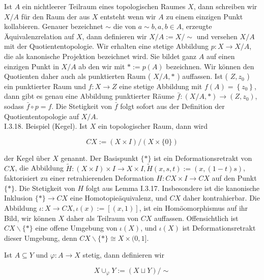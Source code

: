 \documentclass[10pt]{article}
\begin{document}
Ist $A$ ein nichtleerer Teilraum eines topologischen Raumes $X$, dann schreiben wir $X / A$ für den Raum der aus $X$ entsteht wenn wir $A$ zu einem einzigen Punkt kollabieren. Genauer bezeichnet $\sim$ die von $a \sim b, a, b \in A$, erzeugte Äquivalenzrelation auf $X$, dann definieren wir $X / A:=X / \sim$ und versehen $X / A$ mit der Quotiententopologie. Wir erhalten eine stetige Abbildung $p: X \rightarrow X / A$, die als kanonische Projektion bezeichnet wird. Sie bildet ganz $A$ auf einen einzigen Punkt in $X / A$ ab den wir mit $*:=p(A)$ bezeichnen. Wir können den Quotienten daher auch als punktierten Raum ( $X / A, *$ ) auffassen. Ist ( $Z, z_{0}$ ) ein punktierter Raum und $f: X \rightarrow Z$ eine stetige Abbildung mit $f(A)=\left\{z_{0}\right\}$, dann gibt es genau eine Abbildung punktierter Räume $\bar{f}:(X / A, *) \rightarrow\left(Z, z_{0}\right)$, sodass $\bar{f} \circ p=f$. Die Stetigkeit von $\bar{f}$ folgt sofort aus der Definition der Quotiententopologie auf $X / A$.\\
I.3.18. Beispiel (Kegel). Ist $X$ ein topologischer Raum, dann wird

$$
C X:=(X \times I) /(X \times\{0\})
$$

der Kegel über $X$ genannt. Der Basispunkt $\{*\}$ ist ein Deformationsretrakt von $C X$, die Abbildung $\tilde{H}:(X \times I) \times I \rightarrow X \times I, \tilde{H}(x, s, t):=(x,(1-t) s)$, faktorisiert zu einer retrahierenden Deformation $H: C X \times I \rightarrow C X$ auf den Punkt $\{*\}$. Die Stetigkeit von $H$ folgt aus Lemma I.3.17. Insbesondere ist die kanonische Inklusion $\{*\} \rightarrow C X$ eine Homotopieäquivalenz, und $C X$ daher kontrahierbar. Die Abbildung $\iota: X \rightarrow C X, \iota(x):=[(x, 1)]$, ist ein Homöomorphismus auf ihr Bild, wir können $X$ daher als Teilraum von $C X$ auffassen. Offensichtlich ist $C X \backslash\{*\}$ eine offene Umgebung von $\iota(X)$, und $\iota(X)$ ist Deformationsretrakt dieser Umgebung, denn $C X \backslash\{*\} \cong X \times(0,1]$.

Ist $A \subseteq Y$ und $\varphi: A \rightarrow X$ stetig, dann definieren wir

$$
X \cup_{\varphi} Y:=(X \sqcup Y) / \sim
$$
\end{document}

